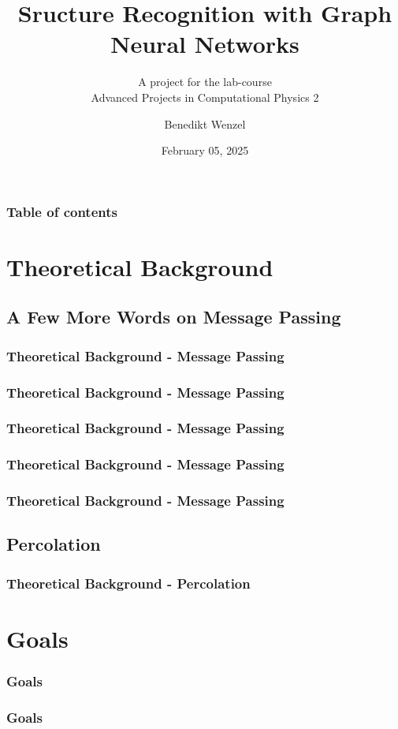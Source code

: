 \documentclass{beamer}
\title{Sructure Recognition with Graph Neural Networks}
\subtitle{A project for the lab-course \\Advanced Projects in Computational Physics 2 }
\date{February 05, 2025}
\author{Benedikt Wenzel}
\begin{document}
\begin{frame}[plain]
\hspace*{-0.7cm}
\begin{minipage}{\textwidth}
    \titlepage    
\end{minipage}
\end{frame}

\begin{frame}
    \frametitle{Table of contents}
    \tableofcontents
\end{frame}

\section{Theoretical Background}
\subsection{A Few More Words on Message Passing}
\begin{frame}
    \frametitle{Theoretical Background - Message Passing}
    
\end{frame}
\begin{frame}
    \frametitle{Theoretical Background - Message Passing}
    
\end{frame}
\begin{frame}
    \frametitle{Theoretical Background - Message Passing}
    
\end{frame}
\begin{frame}
    \frametitle{Theoretical Background - Message Passing}
    
\end{frame}
\begin{frame}
    \frametitle{Theoretical Background - Message Passing}
    
\end{frame}

\subsection{Percolation}
\begin{frame}
    \frametitle{Theoretical Background - Percolation}
    
\end{frame}

\section{Goals}
\begin{frame}
    \frametitle{Goals}
    
\end{frame}
\begin{frame}
    \frametitle{Goals}
    
\end{frame}
\end{document}
